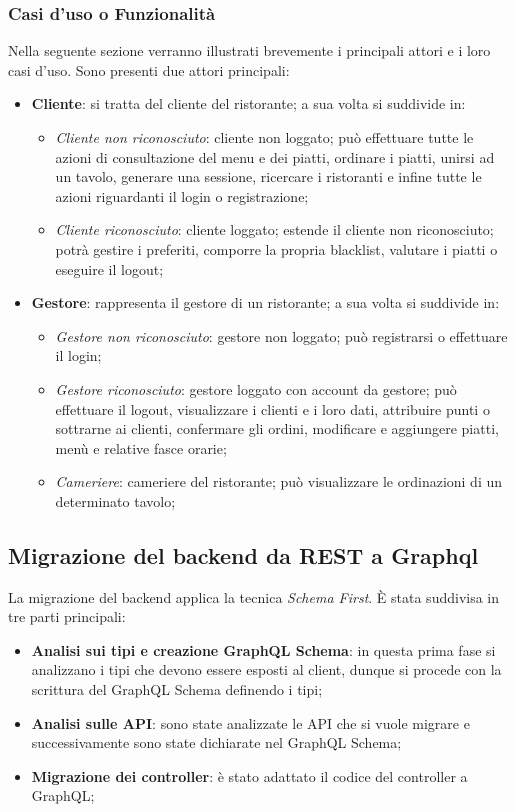 \subsubsection{Casi d'uso o Funzionalità}
Nella seguente sezione verranno illustrati brevemente i principali attori e i loro casi d'uso. Sono presenti due attori principali:
\begin{itemize}
  \item \textbf{Cliente}: si tratta del cliente del ristorante; a sua volta si suddivide in:
    \begin{itemize}
      \item \textit{Cliente non riconosciuto}: cliente non loggato; può effettuare tutte le azioni di consultazione del menu e dei piatti, ordinare i piatti, unirsi ad un tavolo, generare una sessione, ricercare i ristoranti e infine tutte le azioni riguardanti il login o registrazione;
      \item \textit{Cliente riconosciuto}: cliente loggato; estende il cliente non riconosciuto; potrà gestire i preferiti, comporre la propria blacklist, valutare i piatti o eseguire il logout;
    \end{itemize}
  \item \textbf{Gestore}: rappresenta il gestore di un ristorante; a sua volta si suddivide in:
    \begin{itemize}
      \item \textit{Gestore non riconosciuto}: gestore non loggato; può registrarsi o effettuare il login;
      \item \textit{Gestore riconosciuto}: gestore loggato con account da gestore; può effettuare il logout, visualizzare i clienti e i loro dati, attribuire punti o sottrarne ai clienti, confermare gli ordini, modificare e aggiungere piatti, menù e relative fasce orarie;
      \item \textit{Cameriere}: cameriere del ristorante; può visualizzare le ordinazioni di un determinato tavolo;
    \end{itemize}
\end{itemize}
\subsection{Migrazione del backend da REST a Graphql}
La migrazione del backend applica la tecnica \textit{Schema First}. È stata suddivisa in tre parti principali:
\begin{itemize}
  \item \textbf{Analisi sui tipi e creazione GraphQL Schema}: in questa prima fase si analizzano i tipi che devono essere esposti al client, dunque si procede con la scrittura del GraphQL Schema definendo i tipi;
  \item \textbf{Analisi sulle API}: sono state analizzate le API che si vuole migrare e successivamente sono state dichiarate nel GraphQL Schema;
  \item \textbf{Migrazione dei controller}: è stato adattato il codice del controller a GraphQL;
\end{itemize}
